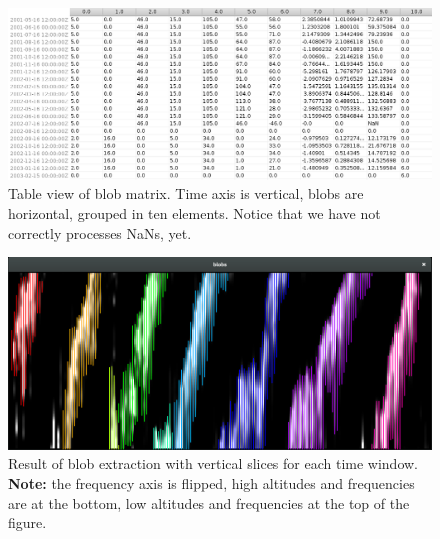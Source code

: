 \documentclass[11pt,a4paper]{article}
\begin{document}
\begin{figure}
\includegraphics[width=\textwidth]{figures/qbo-blobs-table.png}
\caption{Table view of blob matrix. Time axis is vertical,
blobs are horizontal, grouped in ten elements. Notice that we have not correctly processes NaNs, yet.}
\label{fig:qbo-blobs-table}
\end{figure}
%

\begin{figure}
\includegraphics[width=\textwidth]{figures/qbo-blobs-experiment-slices.png}
\caption{Result of blob extraction with vertical slices for each time window. \textbf{Note:} the frequency axis is flipped, high altitudes and frequencies are at the bottom, low altitudes and frequencies at the top of the figure.}
\label{fig:qbo-blobs-experiment-slices}
\end{figure}
%

\end{document}
